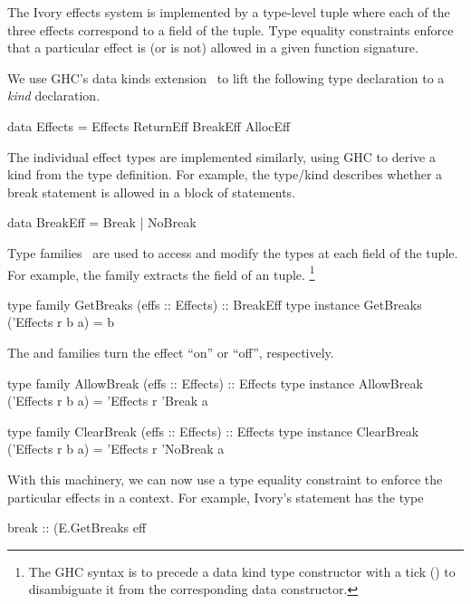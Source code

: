The Ivory effects system is implemented by a type-level tuple
where each of the three effects correspond to a field of the
tuple. Type equality constraints enforce that a particular effect is (or is not)
allowed in a given function signature.

We use GHC's data kinds extension~\cite{data-kinds} to lift the following type
declaration to a \emph{kind} declaration.

\begin{code}
data Effects = Effects ReturnEff BreakEff AllocEff
\end{code}

\noindent
The individual effect types are implemented similarly, using GHC to derive a
kind from the type definition. For example, the  type/kind
describes whether a break statement is allowed in a block of statements.

\begin{code}
data BreakEff = Break | NoBreak
\end{code}

\noindent
Type families~\cite{typefamilies} are used to access and modify the types at each field of
the tuple. For example, the  family extracts the 
field of an  tuple.
\footnote{The GHC syntax is to precede a data kind type constructor with a tick ()
to disambiguate it from the corresponding data constructor.}

\begin{code}
type family   GetBreaks (effs :: Effects) :: BreakEff
type instance GetBreaks ('Effects r b a) = b
\end{code}

\noindent
The  and  families turn the effect ``on'' or
``off'', respectively.

\begin{code}
type family   AllowBreak (effs :: Effects) :: Effects
type instance AllowBreak ('Effects r b a) =
    'Effects r 'Break a

type family   ClearBreak (effs :: Effects) :: Effects
type instance ClearBreak ('Effects r b a) =
    'Effects r 'NoBreak a
\end{code}

With this machinery, we can now use a type equality constraint to enforce
the particular effects in a context. For example, Ivory's  statement
has the type

\begin{code}
break :: (E.GetBreaks eff %
\end{code}

